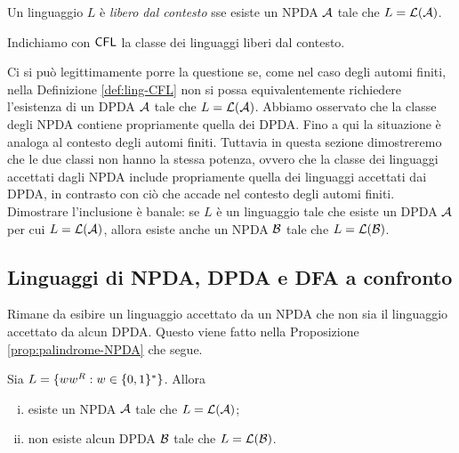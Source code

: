\documentclass[runningheads,a4paper]{llncs}
\begin{document}
\begin{definition}\label{def:ling-CFL}
Un linguaggio $L$ \`{e} \emph{libero dal contesto} sse esiste un NPDA $\mathcal{A}$ tale che $L = \mathcal{L}(\mathcal{A})$.
\end{definition}

Indichiamo con $\mathsf{CFL}$ la classe dei linguaggi liberi dal contesto. 

Ci si pu\`{o} legittimamente porre la questione se, come nel caso degli automi finiti, nella Definizione \ref{def:ling-CFL} non si possa equivalentemente richiedere l'esistenza di un DPDA $\mathcal{A}$ tale che $L = \mathcal{L}(\mathcal{A})$. Abbiamo osservato che la classe degli NPDA contiene propriamente quella dei DPDA. Fino a qui la situazione \`{e} analoga al contesto degli automi finiti. Tuttavia in questa sezione dimostreremo che le due classi non hanno la stessa potenza, ovvero che la classe dei linguaggi accettati dagli NPDA include propriamente quella dei linguaggi accettati dai DPDA, in contrasto con ci\`{o} che accade nel contesto degli automi finiti. Dimostrare l'inclusione \`{e} banale: se $L$ \`{e} un linguaggio tale che esiste un DPDA $\mathcal{A}$ per cui $L = \mathcal{L}(\mathcal{A})$, allora esiste anche un NPDA $\mathcal{B}$ tale che $L = \mathcal{L}(\mathcal{B})$.

\subsection{Linguaggi di NPDA, DPDA e DFA a confronto}

Rimane da esibire un linguaggio accettato da un NPDA che non sia il linguaggio accettato da alcun DPDA. Questo viene fatto nella Proposizione \ref{prop:palindrome-NPDA} che segue.

\begin{proposition}\label{prop:palindrome-NPDA}
Sia $L = \{ww^R : w \in \{0,1\}^* \}$. Allora
\begin{enumerate}[(i)]
  \item esiste un NPDA $\mathcal{A}$ tale che $L = \mathcal{L}(\mathcal{A})$;
  \item non esiste alcun DPDA $\mathcal{B}$ tale che $L =\mathcal{L}(\mathcal{B})$.
\end{enumerate}
\end{proposition}
\end{document}
